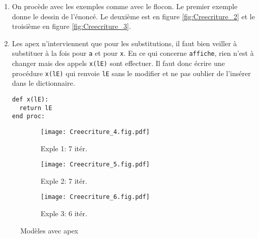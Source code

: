 \begin{enumerate}
\item On procède avec les exemples comme avec le flocon. Le premier exemple donne le dessin de l'énoncé. Le deuxième est en figure \ref{fig:Creecriture_2} et le troisième en figure \ref{fig:Creecriture_3}.
\item Les apex n'interviennent que pour les substitutions, il faut bien veiller à substituer à la fois  pour \verb|a| et pour \verb|x|. En ce qui concerne \verb|affiche|, rien n'est à changer mais des appels \verb|x(lE)| sont effectuer. Il faut donc écrire une procédure \verb|x(lE)| qui renvoie \verb|lE| sans le modifier et ne pas oublier de l'insérer dans le dictionnaire.
\begin{verbatim}
def x(lE):
  return lE
end proc:
\end{verbatim}
\end{enumerate}
\begin{figure}
  \centering
  \begin{subfigure}[b]{4cm}
    \texttt{[image: Creecriture\_4.fig.pdf]}
    \caption{Exple 1: 7 itér.}
    \label{fig:Creecriture_4}
  \end{subfigure}
  \begin{subfigure}[b]{4cm}
    \texttt{[image: Creecriture\_5.fig.pdf]}
    \caption{Exple 2: 7 itér.}
    \label{fig:Creecriture_5}
  \end{subfigure}
  \begin{subfigure}[b]{4cm}
    \texttt{[image: Creecriture\_6.fig.pdf]}
    \caption{Exple 3: 6 itér.}
    \label{fig:Creecriture_6}
  \end{subfigure}
  \caption{Modèles avec apex}
\end{figure}

